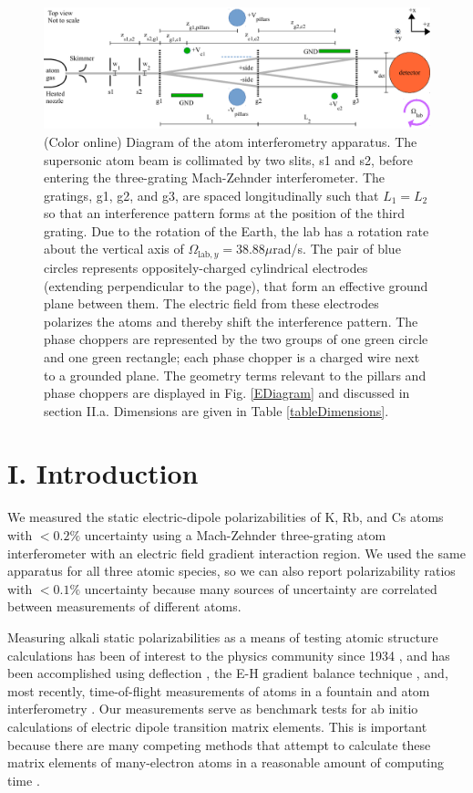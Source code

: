 \documentclass[twocolumn,prl,showpacs,superscriptaddress]{revtex4-1}   %
\newcommand{\figref}[1]{Fig. \ref{#1}}
\newcommand{\Omegalab}{\Omega_{\mathrm{lab},y}}
\begin{document}
\begin{figure}
\includegraphics[width=\linewidth,keepaspectratio]{IFM_diagram1.pdf}
\caption{\label{IFMDiagram}(Color online) Diagram of the atom interferometry apparatus. The supersonic atom beam is collimated by two slits, s1 and s2, before entering the three-grating Mach-Zehnder interferometer. 
The gratings, g1, g2, and g3, are spaced longitudinally such that $L_1 = L_2$ so that an interference pattern forms at the position of the third grating.
Due to the rotation of the Earth, the lab has a rotation rate about the vertical axis of $\Omegalab = 38.88\mu$rad/s. 
The pair of blue circles represents oppositely-charged cylindrical electrodes (extending perpendicular to the page), that form an effective ground plane between them. The electric field from these electrodes polarizes the atoms and thereby shift the interference pattern. 
The phase choppers are represented by the two groups of one green circle and one green rectangle; each phase chopper is a charged wire next to a grounded plane. The geometry terms relevant to the pillars and phase choppers are displayed in \figref{EDiagram} and discussed in section II.a. Dimensions are given in Table \ref{tableDimensions}.}
\end{figure}

\section{I. Introduction}

We measured the static electric-dipole polarizabilities of K, Rb, and Cs atoms with $<0.2\%$ uncertainty using a Mach-Zehnder three-grating atom interferometer \cite{Berman1997,Cronin2009} with an electric field gradient interaction region. We used the same apparatus for all three atomic species, so we can also report polarizability ratios with $<0.1\%$ uncertainty because many sources of uncertainty are correlated between measurements of different atoms. 

Measuring alkali static polarizabilities as a means of testing atomic 
structure calculations has been of interest to the physics community since
1934 \cite{Scheffers1934}, and has been
accomplished using deflection \cite{Scheffers1934,Chamberlain1963,Hall1974}, the E-H gradient
balance technique \cite{Salop1961,Molof1974}, and, most recently, time-of-flight measurements of atoms in a fountain \cite{Amini2003} and atom interferometry 
\cite{Ekstrom1995,Miffre2006,Holmgren2010}.
Our measurements serve as benchmark tests for ab initio calculations of electric dipole transition matrix elements. This is important because there are many competing methods that attempt to calculate these matrix elements of many-electron atoms in a reasonable amount of computing time \cite{Mitroy2010}. 
\end{document}

